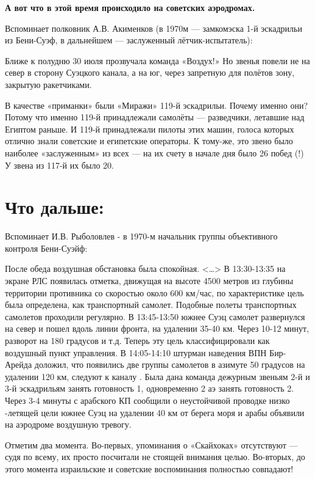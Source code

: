 \textbf{А вот что в этой время происходило на советских аэродромах.}

Вспоминает полковник А.В. Акименков (в 1970м — замкомэска 1-й эскадрильи из Бени-Суэф, в дальнейшем — заслуженный лётчик-испытатель):

\begin{textcitation}
	Ближе к полудню 30 июля прозвучала команда «Воздух!» Но звенья повели не на север в сторону Суэцкого канала, а на юг, через запретную для полётов зону, закрытую ракетчиками. 
\end{textcitation}

В качестве «приманки» были «Миражи» 119-й эскадрильи. Почему именно они? Потому что именно 119-й принадлежали самолёты — разведчики, летавшие над Египтом раньше. И 119-й принадлежали пилоты этих машин, голоса которых отлично знали советские и египетские операторы. К тому-же, это звено было наиболее «заслуженным» из всех — на их счету в начале дня было 26 побед (!) У звена из 117-й их было 20.

\section{Что дальше:}

Вспоминает И.В. Рыболовлев - в 1970-м начальник группы объективного контроля Бени-Суэйф:

\begin{textcitation}
	После обеда воздушная обстановка была спокойная. <…> В 13:30-13:35 на экране РЛС появилась отметка, движущая на высоте 4500 метров из глубины территории противника со скоростью около 600 км/час, по характеристике цель была определена, как транспортный самолет. Подобные полеты транспортных самолетов проходили регулярно. В 13:45-13:50 южнее Суэц самолет развернулся на север и пошел вдоль линии фронта, на удалении 35-40 км. Через 10-12 минут, разворот на 180 градусов и т.д. Теперь эту цель классифицировали как воздушный пункт управления. В 14:05-14:10 штурман наведения ВПН Бир-Арейда доложил, что появились две группы самолетов в азимуте 50 градусов на удалении 120 км, следуют к каналу . Была дана команда дежурным звеньям 2-й и 3-й эскадрильям занять готовность 1, одновременно 2 аэ занять готовность 2. Через 3-4 минуты с арабского КП сообщили о неустойчивой проводке низко -летящей цели южнее Суэц на удалении 40 км от берега моря и арабы объявили на аэродроме воздушную тревогу.
\end{textcitation}

Отметим два момента. Во-первых, упоминания о «Скайхоках» отсутствуют — судя по всему, их просто посчитали не стоящей внимания целью. Во-вторых, до этого момента израильские и советские воспоминания полностью совпадают!

